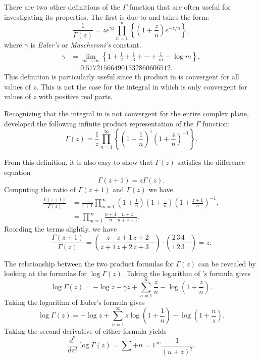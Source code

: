 There are two other definitions of the $\Gamma$ function that are
often useful for investigating its properties.  The first is due to
{\Weierstrass}
\cite{Weierstrass56} and
takes the form:
\begin{equation} \label{GammaWeierDef:Eq}
\frac{1}{\Gamma(z)} = z e^{\gamma z} \prod_{n=1}^{\infty} \left\{\left(1+
\frac{z}{n}\right)e^{-z/n}\right\},
\end{equation}
where $\gamma$ is {\em Euler's} or {\em Mascheroni's} constant.
\[
\begin{aligned}
\gamma & = \displaystyle \lim_{m\rightarrow\infty} \left\{1 + \frac{1}{2} +
\frac{1}{3} + \cdots + \frac{1}{m} - \log m\right\}, \\
 & = 0.577215664901532860606512.
\end{aligned}
\]
This definition is particularly useful since th product in
 is convergent for all values of $z$.  This
is not the case for the integral in  which
is only convergent for values of $z$ with positive real parts.

Recognizing that the integral in  is not
convergent for the entire complex plane, {\Euler} developed the
following infinite product representation of the $\Gamma$
function: 
\begin{equation} \label{GammaEulerDef:Eq}
\Gamma(z) = \frac{1}{z} \prod_{n=1}^{\infty} \left\{ \left( 1 +
\frac{1}{n}\right)^z \left(1 +  \frac{z}{n}\right)^{-1}\right\}.
\end{equation}

From this definition, it is also easy to show that $\Gamma(z)$
satisfies the difference equation
\[
\Gamma(z+1) = z \Gamma(z).
\]
Computing the ratio of $\Gamma(z+1)$ and $\Gamma(z)$ we have
\[
\begin{aligned}
\displaystyle \frac{\Gamma(z+1)}{\Gamma(z)} &
\displaystyle = \frac{z}{z+1} \prod_{m=1}^{\infty}
\left(1 + \frac{1}{n}\right) \left(1 + \frac{z}{n}\right)
\left(1 + \frac{z+1}{n}\right)^{-1}, \\
& \displaystyle = 
\prod_{m=1}^{\infty} \frac{n+1}{n} \frac{n+z}{n+z+1}.
\end{aligned}
\]
Reording the terms slightly, we have
\[
\frac{\Gamma(z+1)}{\Gamma(z)} = 
\left( \frac{z}{z+1} \frac{z+1}{z+2} \frac{z+2}{z+3} \cdots\right)
\cdot
\left(\frac{2}{1} \frac{3}{2} \frac{4}{3} \cdots \right) = z.
\]

The relationship between the two product formulas for $\Gamma(z)$ can
be revealed by looking at the formulas for $\log \Gamma(z)$.  Taking
the logarithm of {\Weierstrass}'s formula 
gives
\[
\log \Gamma(z) = 
- \log z - \gamma z + \sum_{n=1}^{\infty} \frac{z}{n} - \log \left(1 + \frac{z}{n}\right).
\]
Taking the logarithm of Euler's formula 
gives
\[
\log \Gamma(z) = - \log z + \sum_{n=1}^{\infty} z \log \left(1+
\frac{1}{n}\right) - \log \left( 1 + \frac{n}{z}\right).
\]
Taking the second derivative of either formula yields
\[
\frac{d^2}{dz^2} \log \Gamma(z) = \sum+{n=1}^{\infty}
\frac{1}{(n+z)^2}.
\]

